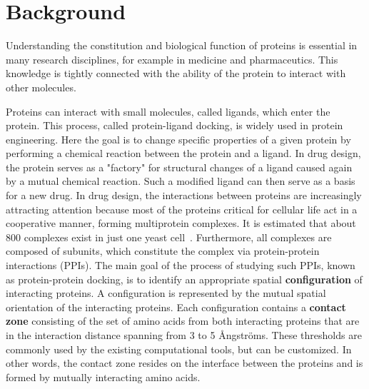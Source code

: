 \documentclass[twocolumn]{bmcart}%
\begin{document}


\section*{Background}
Understanding the constitution and biological function of proteins is essential in many research disciplines, for example in medicine and pharmaceutics.
This knowledge is tightly connected with the ability of the protein to interact with other molecules.

Proteins can interact with small molecules, called ligands, which enter the protein.
This process, called protein-ligand docking, is widely used in protein engineering.
Here the goal is to change specific properties of a given protein by performing a chemical reaction between the protein and a ligand.
In drug design, the protein serves as a "factory" for structural changes of a ligand caused again by a mutual chemical reaction. 
Such a modified ligand can then serve as a basis for a new drug. 
In drug design, the interactions between proteins are increasingly attracting attention because most of the proteins critical for cellular life act in a cooperative manner, forming multiprotein complexes. 
It is estimated that about 800 complexes exist in just one yeast cell~\cite{Gavin}. 
Furthermore, all complexes are composed of subunits, which constitute the complex via protein-protein interactions (PPIs).
The main goal of the process of studying such PPIs, known as protein-protein docking, is to identify an appropriate spatial \textbf{configuration} of interacting proteins.
A configuration is represented by the mutual spatial orientation of the interacting proteins.
Each configuration contains a \textbf{contact zone} consisting of the set of amino acids from both interacting proteins that are in the interaction distance spanning from 3 to 5 \AA ngstr\"{o}ms.
These thresholds are commonly used by the existing computational tools, but can be customized.
In other words, the contact zone resides on the interface between the proteins and is formed by mutually interacting amino acids.
\end{document}

